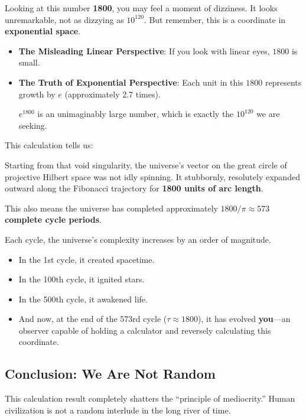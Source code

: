 Looking at this number \textbf{1800}, you may feel a moment of dizziness. It looks unremarkable, not as dizzying as $10^{120}$. But remember, this is a coordinate in \textbf{exponential space}.

\begin{itemize}
\item \textbf{The Misleading Linear Perspective}: If you look with linear eyes, $1800$ is small.

\item \textbf{The Truth of Exponential Perspective}: Each unit in this $1800$ represents growth by $e$ (approximately 2.7 times).

$e^{1800}$ is an unimaginably large number, which is exactly the $10^{120}$ we are seeking.
\end{itemize}

This calculation tells us:

Starting from that void singularity, the universe's vector on the great circle of projective Hilbert space was not idly spinning. It stubbornly, resolutely expanded outward along the Fibonacci trajectory for \textbf{1800 units of arc length}.

This also means the universe has completed approximately \textbf{$1800 / \pi \approx 573$ complete cycle periods}.

Each cycle, the universe's complexity increases by an order of magnitude.

\begin{itemize}
\item In the 1st cycle, it created spacetime.

\item In the 100th cycle, it ignited stars.

\item In the 500th cycle, it awakened life.

\item And now, at the end of the 573rd cycle ($\tau \approx 1800$), it has evolved \textbf{you}---an observer capable of holding a calculator and reversely calculating this coordinate.
\end{itemize}

\subsection{Conclusion: We Are Not Random}

This calculation result completely shatters the ``principle of mediocrity.'' Human civilization is not a random interlude in the long river of time.


